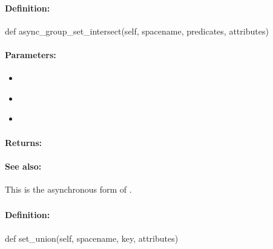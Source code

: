 \paragraph{Definition:}
\begin{pythoncode}
def async_group_set_intersect(self, spacename, predicates, attributes)
\end{pythoncode}

\paragraph{Parameters:}
\begin{itemize}[noitemsep]
\item {}\\

\item {}\\

\item {}\\

\end{itemize}

\paragraph{Returns:}


\paragraph{See also:}  This is the asynchronous form of .

\pagebreak
\subsubsection{}
\label{api:python:set_union}


\paragraph{Definition:}
\begin{pythoncode}
def set_union(self, spacename, key, attributes)
\end{pythoncode}

